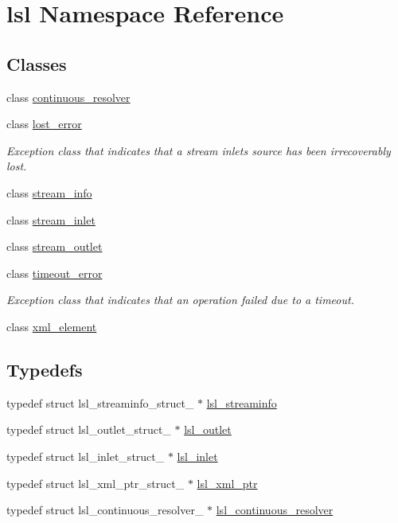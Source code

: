 \hypertarget{namespacelsl}{}\section{lsl Namespace Reference}
\label{namespacelsl}
\subsection*{Classes}
\begin{DoxyCompactItemize}
\item 
class \hyperlink{classlsl_1_1continuous__resolver}{continuous\+\_\+resolver}
\item 
class \hyperlink{classlsl_1_1lost__error}{lost\+\_\+error}
\begin{DoxyCompactList}\small\item\em Exception class that indicates that a stream inlet\textquotesingle{}s source has been irrecoverably lost. \end{DoxyCompactList}\item 
class \hyperlink{classlsl_1_1stream__info}{stream\+\_\+info}
\item 
class \hyperlink{classlsl_1_1stream__inlet}{stream\+\_\+inlet}
\item 
class \hyperlink{classlsl_1_1stream__outlet}{stream\+\_\+outlet}
\item 
class \hyperlink{classlsl_1_1timeout__error}{timeout\+\_\+error}
\begin{DoxyCompactList}\small\item\em Exception class that indicates that an operation failed due to a timeout. \end{DoxyCompactList}\item 
class \hyperlink{classlsl_1_1xml__element}{xml\+\_\+element}
\end{DoxyCompactItemize}
\subsection*{Typedefs}
\begin{DoxyCompactItemize}
\item 
typedef struct lsl\+\_\+streaminfo\+\_\+struct\+\_\+ $\ast$ \hyperlink{namespacelsl_aa0a9ce9956061679949daa2e35aae2e8}{lsl\+\_\+streaminfo}
\item 
typedef struct lsl\+\_\+outlet\+\_\+struct\+\_\+ $\ast$ \hyperlink{namespacelsl_abcf512b0f66dacf86c10b165995fd50b}{lsl\+\_\+outlet}
\item 
typedef struct lsl\+\_\+inlet\+\_\+struct\+\_\+ $\ast$ \hyperlink{namespacelsl_a884a3363cfcba75d7ce8f00c1c4c54f1}{lsl\+\_\+inlet}
\item 
typedef struct lsl\+\_\+xml\+\_\+ptr\+\_\+struct\+\_\+ $\ast$ \hyperlink{namespacelsl_a5edc7a49a1a1be1634fe6dce3d59c59b}{lsl\+\_\+xml\+\_\+ptr}
\item 
typedef struct lsl\+\_\+continuous\+\_\+resolver\+\_\+ $\ast$ \hyperlink{namespacelsl_ab09ea0488f986f056322c3c866dc0a0f}{lsl\+\_\+continuous\+\_\+resolver}
\end{DoxyCompactItemize}
